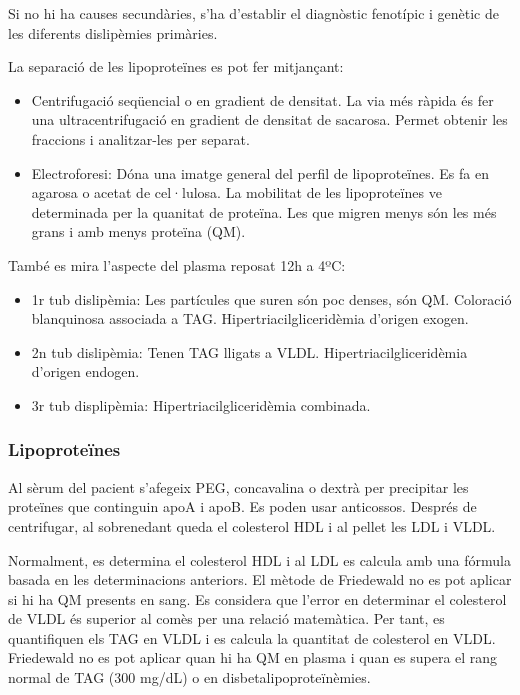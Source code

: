 Si no hi ha causes secundàries, s'ha d'establir el diagnòstic
fenotípic i genètic de les diferents dislipèmies primàries.

La separació de les lipoproteïnes es pot fer mitjançant:
\begin{itemize}
\item Centrifugació seqüencial o en gradient de densitat. La via més
  ràpida és fer una ultracentrifugació en gradient de densitat de
  sacarosa. Permet obtenir les fraccions i analitzar-les per separat.

\item Electroforesi: Dóna una imatge general del perfil de
  lipoproteïnes. Es fa en agarosa o acetat de cel·lulosa. La mobilitat
  de les lipoproteïnes ve determinada per la quanitat de proteïna. Les
  que migren menys són les més grans i amb menys proteïna (QM).
\end{itemize}

També es mira l'aspecte del plasma reposat 12h a 4ºC:
\begin{itemize}
\item 1r tub dislipèmia: Les partícules que suren són poc
  denses, són QM. Coloració blanquinosa associada a
  TAG. Hipertriacilgliceridèmia d'origen exogen.

\item 2n tub dislipèmia: Tenen TAG lligats a
  VLDL. Hipertriacilgliceridèmia d'origen endogen.

\item 3r tub displipèmia: Hipertriacilgliceridèmia combinada.
\end{itemize}
 
\subsubsection{Lipoproteïnes}
\label{sec:lipoproteines}
Al sèrum del pacient s'afegeix PEG, concavalina o dextrà per
precipitar les proteïnes que continguin apoA i apoB. Es poden usar
anticossos. Després de centrifugar, al sobrenedant queda el colesterol
HDL i al pellet les LDL i VLDL. 

Normalment, es determina el colesterol HDL i al LDL es calcula amb una
fórmula basada en les determinacions anteriors. El mètode de
Friedewald no es pot aplicar si hi ha QM presents en sang. Es
considera que l'error en determinar el colesterol de VLDL és superior
al comès per una relació matemàtica. Per tant, es quantifiquen els TAG
en VLDL i es calcula la quantitat de colesterol en VLDL. Friedewald no
es pot aplicar quan hi ha QM en plasma i quan es supera el rang normal
de TAG (300 mg/dL) o en disbetalipoproteïnèmies.

